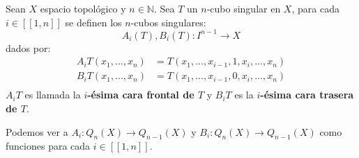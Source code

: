 \documentclass[12pt]{report}
\newcounter{it}
\theoremstyle{largebreak}
\newcommand\cf[3]{\ensuremath{#1:#2\rightarrow#3}}
\newcommand\natint[1]{\ensuremath{\left[\!\left[ #1\right]\!\right]}}
\begin{document}
    \begin{mydef}
        Sean $X$ espacio topológico y $n\in\mathbb{N}$. Sea $T$ un $n$-cubo singular en $X$, para cada $i\in\natint{1,n}$ se definen los $n$-cubos singulares:
        \begin{equation*}
            \cf{A_i(T),B_i(T)}{I^{ n-1}}{X}
        \end{equation*}
        dados por:
        \begin{equation*}
            \begin{split}
                A_iT(x_1,...,x_n)&=T(x_1,...,x_{ i-1},1,x_i,...,x_n)\\
                B_iT(x_1,...,x_n)&=T(x_1,...,x_{ i-1},0,x_i,...,x_n)\\
            \end{split}
        \end{equation*}
        $A_iT$ es llamada la \textbf{$i$-ésima cara frontal de $T$} y $B_iT$ es la \textbf{$i$-ésima cara trasera de $T$}.
    \end{mydef}

    \begin{obs}
        Podemos ver a $\cf{A_i}{Q_n(X)}{Q_{ n-1}(X)}$ y $\cf{B_i}{Q_n(X)}{Q_{ n-1}(X)}$ como funciones para cada $i\in\natint{1,n}$.
    \end{obs}
\end{document}

